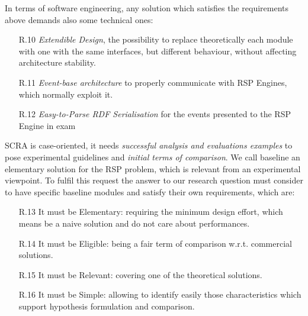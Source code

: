 In terms of software engineering, any solution which satisfies the requirements above demands also some technical ones: 
\begin{enumerate}
\item[R.10] \textit{Extendible Design}, the possibility to replace theoretically each module with one with the same interfaces, but different behaviour, without affecting architecture stability.
\item[R.11] \textit{Event-base architecture} to properly communicate with  RSP Engines, which normally exploit it.
\item[R.12] \textit{Easy-to-Parse RDF Serialisation} for the events presented to the RSP Engine in exam
\end{enumerate}

\noindent SCRA is case-oriented, it needs \textit{successful analysis and evaluations examples} to pose experimental guidelines and \textit{initial terms of comparison}. We call baseline an elementary solution for the RSP problem, which is relevant from an experimental viewpoint. To fulfil this request the answer to our research question must consider to have specific baseline modules and satisfy their own requirements, which are: \begin{enumerate}
\item[R.13] It must be Elementary: requiring the minimum design effort, which means be a naive solution and do not care about performances.  %
\item[R.14] It must be Eligible: being a fair term of comparison w.r.t. commercial solutions. %
\item[R.15] It must be Relevant: covering one of the theoretical solutions. %
\item[R.16] It must be Simple: allowing to identify easily those characteristics which support hypothesis formulation and comparison.  %
\end{enumerate}

